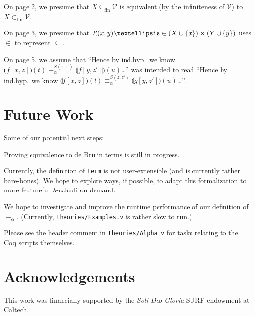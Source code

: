 \documentclass{article}
\begin{document}
On page 2, we presume that $X \subseteq_{\textrm{fin}} \mathcal{V}$ is equivalent (by the
infiniteness of $\mathcal{V}$) to $X \subset_{\textrm{fin}} \mathcal{V}$.

On page 3, we presume that $R(x,y) \textellipsis \in (X \cup \{ x \}) \times (Y \cup \{ y \})$ uses $\in$ to
represent $\subseteq$.

On page 5, we assume that ``Hence by ind.hyp.\ we know $\llparenthesis f[x,z] \rrparenthesis (t)
\equiv_\alpha^{S(z,z')} \llparenthesis f[y,z'] \rrparenthesis (u)$\dots'' was intended to read
``Hence by ind.hyp.\ we know $\llparenthesis f[x,z] \rrparenthesis (t) \equiv_\alpha^{S(z,z')}
\llparenthesis g[y,z'] \rrparenthesis (u)$\dots''.

\section{Future Work}

Some of our potential next steps:

Proving equivalence to de Bruijn terms is still in progress.

Currently, the definition of \verb|term| is not user-extensible (and is currently rather
bare-bones). We hope to explore ways, if possible, to adapt this formalization to more featureful
$\lambda$-calculi on demand.

We hope to investigate and improve the runtime performance of our definition of $\equiv_\alpha$.
(Currently, \verb|theories/Examples.v| is rather slow to run.)

Please see the header comment in \verb|theories/Alpha.v| for tasks relating to the Coq scripts
themselves.

\section{Acknowledgements}

This work was financially supported by the \emph{Soli Deo Gloria} SURF endowment at Caltech.
\end{document}
